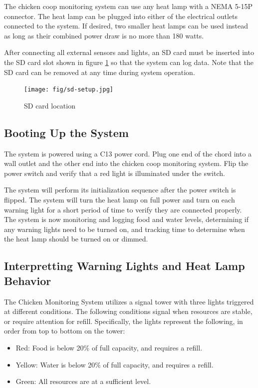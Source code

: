 \documentclass{article}
\begin{document}
The chicken coop monitoring system can use any heat lamp with a NEMA 5-15P connector.  The heat lamp can be plugged into either of the electrical outlets connected to the system.  If desired, two smaller heat lamps can be used instead as long as their combined power draw is no more than 180 watts.

After connecting all external sensors and lights, an SD card must be inserted into the SD card slot shown in figure \ref{fig:sd-card-location} so that the system can log data.  Note that the SD card can be removed at any time during system operation.

\begin{figure}[H]
    \centering
    \texttt{[image: fig/sd-setup.jpg]}
    \caption{SD card location}
    \label{fig:sd-card-location}
\end{figure}

\subsection{Booting Up the System}
The system is powered using a C13 power cord.  Plug one end of the chord into a wall outlet and the other end into the chicken coop monitoring system.  Flip the power switch and verify that a red light is illuminated under the switch.

The system will perform its initialization sequence after the power switch is flipped.  The system will turn the heat lamp on full power and turn on each warning light for a short period of time to verify they are connected properly.  The system is now monitoring and logging food and water levels, determining if any warning lights need to be turned on, and tracking time to determine when the heat lamp should be turned on or dimmed.

\subsection{Interpretting Warning Lights and Heat Lamp Behavior}
The Chicken Monitoring System utilizes a signal tower with three lights triggered at different conditions. The following conditions signal when resources are stable, or require attention for refill. Specifically, the lights represent the following, in order from top to bottom on the tower:

\begin{itemize}
    \item Red: Food is below 20\% of full capacity, and requires a refill.
    \item Yellow: Water is below 20\% of full capacity, and requires a refill.
    \item Green: All resources are at a sufficient level.
\end{itemize}
\end{document}
